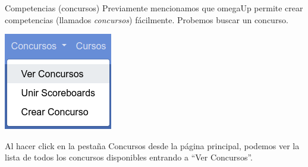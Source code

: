 \documentclass{beamer}
\begin{document}
    \begin{frame}{Competencias (concursos)}
        Previamente mencionamos que omegaUp permite crear competencias (llamados \textit{concursos}) fácilmente. \pause Probemos buscar un concurso. \vspace{8pt} \pause

        \begin{minipage}{.35\linewidth}
            \includegraphics[width=.9\linewidth]{./ou_contest_bar.png}
        \end{minipage}\pause
        \begin{minipage}{.64\linewidth}
            Al hacer click en la pestaña Concursos desde la página principal, podemos ver la lista de todos los concursos disponibles entrando a ``Ver Concursos''.
        \end{minipage}
    \end{frame}
\end{document}
